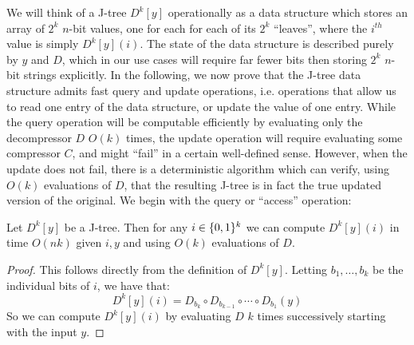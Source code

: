 We will think of a J-tree $D^k[y]$ operationally as a data structure which stores an array of $2^k$ $n$-bit values, one for each for each of its $2^k$ ``leaves'', where the $i^{th}$ value is simply $D^k[y](i)$. The state of the data structure is described purely by $y$ and $D$, which in our use cases will require far fewer bits then storing $2^k$ $n$-bit strings explicitly. In the following, we now prove that the J-tree data structure admits fast query and update operations, i.e. operations that allow us to read one entry of the data structure, or update the value of one entry. While the query operation will be computable efficiently by evaluating only the decompressor $D$ $O(k)$ times, the update operation will require evaluating some compressor $C$, and might ``fail'' in a certain well-defined sense. However, when the update does not fail, there is a deterministic algorithm which can verify, using $O(k)$ evaluations of $D$, that the resulting J-tree is in fact the true updated version of the original. We begin with the query or ``access'' operation: 
\begin{lemma}\label{lossy:lem:access}
Let $D^k[y]$ be a J-tree. Then for any $i \in \{0,1\}^k$ we can compute $D^k[y](i)$ in time $O(n k)$ given $i,y$ and using $O(k)$ evaluations of $D$.
\end{lemma}
\begin{proof}
This follows directly from the definition of $D^k[y]$. Letting $b_1, \ldots, b_k$ be the individual bits of $i$, we have that:
\[
D^k[y](i) = D_{b_k} \circ D_{b_{k-1}} \circ \cdots \circ D_{b_1} (y)
\]
So we can compute $D^k[y](i)$ by evaluating $D$ $k$ times successively starting with the input $y$.
\end{proof}


